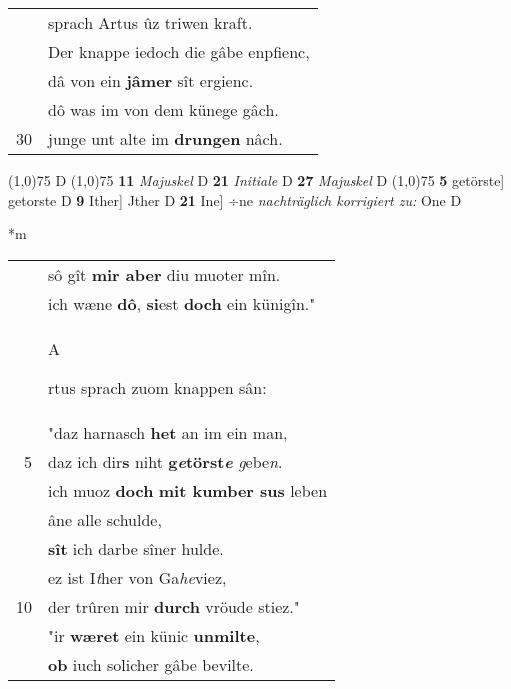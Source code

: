 \documentclass[8pt,a4paper,notitlepage]{article}
\begin{document}
\begin{table}[ht]
\begin{minipage}[t]{0.5\linewidth}
\begin{tabular}{rl}
 & sprach Artus ûz triwen kraft.\\ 
 & Der knappe iedoch die gâbe enpfienc,\\ 
 & dâ von ein \textbf{jâmer} sît ergienc.\\ 
 & dô was im von dem künege gâch.\\ 
30 & junge unt alte im \textbf{drungen} nâch.\\ 
\end{tabular}
\scriptsize
\line(1,0){75} \newline
D \newline
\line(1,0){75} \newline
\textbf{11} \textit{Majuskel} D  \textbf{21} \textit{Initiale} D  \textbf{27} \textit{Majuskel} D  \newline
\line(1,0){75} \newline
\textbf{5} getörste] getorste D \textbf{9} Ither] Jther D \textbf{21} Ine] ÷ne \textit{nachträglich korrigiert zu:} One D \newline
\end{minipage}
\hspace{0.5cm}
\begin{minipage}[t]{0.5\linewidth}
\small
\begin{center}*m
\end{center}
\begin{tabular}{rl}
 & sô gît \textbf{mir aber} diu muoter mîn.\\ 
 & ich wæne \textbf{dô}, \textbf{si}est \textbf{doch} ein künigîn."\\ 
 & \begin{large}A\end{large}rtus sprach zuom knappen sân:\\ 
 & "daz harnasch \textbf{het} an im ein man,\\ 
5 & daz ich dir\textbf{s} niht \textbf{g\textit{e}törst\textit{e}} \textit{g}ebe\textit{n}.\\ 
 & ich muoz \textbf{doch} \textbf{mit kumber sus} leben\\ 
 & âne alle schulde,\\ 
 & \textbf{sît} ich darbe sîner hulde.\\ 
 & ez ist I\textit{t}her von Ga\textit{he}viez,\\ 
10 & der trûren mir \textbf{durch} vröude stiez."\\ 
 & "ir \textbf{wæret} ein künic \textbf{unmilte},\\ 
 & \textbf{ob} iuch solicher gâbe bevilte.\\ 

\end{tabular}
\end{minipage}
\end{table}
\end{document}
